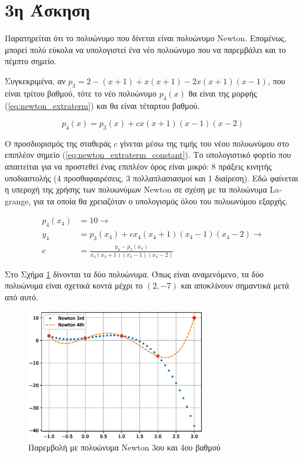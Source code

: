 \documentclass[assignment3.tex]{subfiles}
\begin{document}
\section*{3η Άσκηση}
Παρατηρείται ότι το πολυώνυμο που δίνεται είναι πολυώνυμο \textlatin{Newton}. Επομένως, μπορεί πολύ εύκολα να υπολογιστεί ένα νέο πολυώνυμο που να παρεμβάλει και το πέμπτο σημείο.

Συγκεκριμένα, αν $p_3=2-(x+1)+x(x+1)-2x(x+1)(x-1)$, που είναι τρίτου βαθμού, τότε το νέο πολυώνυμο $p_4(x)$ θα είναι της μορφής (\ref{eq:newton_extraterm}) και θα είναι τέταρτου βαθμού. 

\begin{equation}
p_4(x) = p_3(x) + cx(x+1)(x-1)(x-2)
\label{eq:newton_extraterm}
\end{equation}

Ο προσδιορισμός της σταθεράς $c$ γίνεται μέσω της τιμής του νέου πολυωνύμου στο επιπλέον σημείο (\ref{eq:newton_extraterm_constant}). Το υπολογιστικό φορτίο που απαιτείται για να προστεθεί ένας επιπλέον όρος είναι μικρό: 8 πράξεις κινητής υποδιαστολής (4 προσθαφαιρέσεις, 3 πολλαπλασιασμοί και 1 διαίρεση). Εδώ φαίνεται η υπεροχή της χρήσης των πολυωνύμων \textlatin{Newton} σε σχέση με τα πολυώνυμα \textlatin{Lagrange}, για τα οποία θα χρειαζόταν ο υπολογισμός όλου του πολυωνύμου εξαρχής.

\begin{equation}
\begin{split}
p_4(x_4) &= 10 \rightarrow \\
 y_4 &= p_3(x_4) + cx_4(x_4+1)(x_4-1)(x_4-2) \rightarrow \\
 c &= \frac{y_4-p_3(x_4)}{x_4(x_4+1)(x_4-1)(x_4-2)}
\end{split}
\label{eq:newton_extraterm_constant}
\end{equation}

Στο Σχήμα \ref{fig:ex3} δίνονται τα δύο πολυώνυμα. Όπως είναι αναμενόμενο, τα δύο πολυώνυμα είναι σχετικά κοντά μέχρι το $(2,-7)$ και αποκλίνουν σημαντικά μετά από αυτό.

\begin{figure}[hp]
	\includegraphics[width=0.7\textwidth]{ex3.eps}
	\centering
	\caption{Παρεμβολή με πολυώνυμα \textlatin{Newton} 3ου και 4ου βαθμού}
	\label{fig:ex3}
\end{figure}
\end{document}
